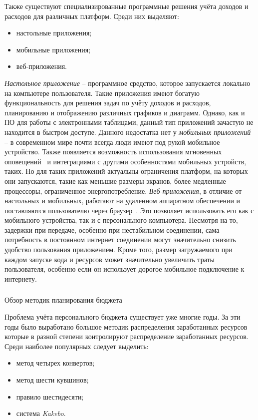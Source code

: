 Также существуют специализированные программные решения учёта доходов и расходов для различных платформ.
Среди них выделяют:
\begin{itemize}
    \item настольные приложения;
    \item мобильные приложения;
    \item веб-приложения.
\end{itemize}

\emph{Настольное приложение} -- программное средство, которое запускается локально на компьютере пользователя.
Такие приложения имеют богатую функциональность для решения задач по учёту доходов и расходов, планированию и отображению различных графиков и диаграмм.
Однако, как и ПО для работы с электронными таблицами, данный тип приложений зачастую не находится в быстром доступе.
Данного недостатка нет у \emph{мобильных приложений} -- в современном мире почти всегда люди имеют под рукой мобильное устройство.
Также появляется возможность использования мгновенных оповещений~\cite{desktop_mobile_differences} и интеграциями с другими особенностями мобильных устройств, таких.
Но для таких приложений актуальны ограничения платформ, на которых они запускаются, такие как меньшие размеры экранов, более медленные процессоры, ограниченное энергопотребление.
\emph{Веб-приложения}, в отличие от настольных и мобильных, работают на удаленном аппаратном обеспечении и поставляются пользователю через браузер~\cite{web_based_vs_desktop}.
Это позволяет использовать его как с мобильного устройства, так и с персонального компьютера.
Несмотря на то, задержки при передаче, особенно при нестабильном соединении, сама потребность в постоянном интернет соединении могут значительно снизить удобство пользования приложением.
Кроме того, размер загружаемого при каждом запуске кода и ресурсов может значительно увеличить траты пользователя, особенно если он использует дорогое мобильное подключение к интернету.

\subsubsection{} Обзор методик планирования бюджета
\label{sec:analysis:literature:optimization}

Проблема учёта персонального бюджета существует уже многие годы.
За эти годы было выработано большое методик распределения заработанных ресурсов которые в разной степени контролируют распределение заработанных ресурсов.
Среди наиболее популярных следует выделить:
\begin{itemize}
    \item метод четырех конвертов;
    \item метод шести кувшинов;
    \item правило шестидесяти;
    \item система \emph{Kakebo}.
\end{itemize}

